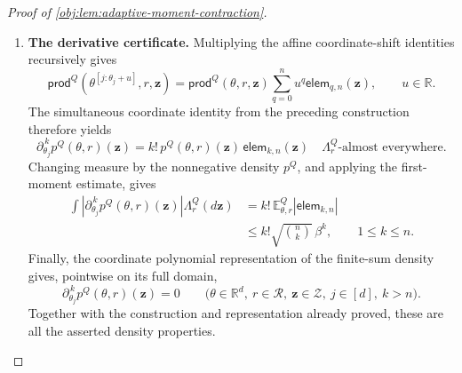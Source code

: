 \begin{proof}[Proof of \cref{obj:lem:adaptive-moment-contraction}]
\begin{enumerate}
The nonnegative centered square gives
\[
\begin{split}
0
&\le
\mathbb E^Q_{\theta,r}
 \left[
 \left(
 |\mathsf{elem}_{k,v}|
 -\mathbb E^Q_{\theta,r}|\mathsf{elem}_{k,v}|
 \right)^2
 \right]\\
&=
\mathbb E^Q_{\theta,r}[\mathsf{elem}_{k,v}^2]
-\left(\mathbb E^Q_{\theta,r}|\mathsf{elem}_{k,v}|\right)^2.
\end{split}
\]
Since \(\beta\ge0\), it follows that
\[
\mathbb E^Q_{\theta,r}|\mathsf{elem}_{k,v}|
\le\sqrt{\binom vk}\,\beta^k.
\]

\item \textbf{The derivative certificate.}
Multiplying the affine coordinate-shift identities recursively gives
\[
\mathsf{prod}^Q(\theta^{[j:\theta_j+u]},r,\mathbf z)
=
\mathsf{prod}^Q(\theta,r,\mathbf z)
\sum_{q=0}^n u^q\mathsf{elem}_{q,n}(\mathbf z),
\qquad u\in\mathbb R.
\]
The simultaneous coordinate identity from the preceding construction therefore yields
\[
\partial_{\theta_j}^{\,k}p^Q(\theta,r)(\mathbf z)
=
k!\,p^Q(\theta,r)(\mathbf z)\,
\mathsf{elem}_{k,n}(\mathbf z)
\quad
\Lambda_r^Q\text{-almost everywhere}.
\]
Changing measure by the nonnegative density \(p^Q\), and applying the first-moment estimate, gives
\[
\begin{split}
\int
\left|\partial_{\theta_j}^{\,k}p^Q(\theta,r)(\mathbf z)\right|
 \Lambda_r^Q(d\mathbf z)
&=
k!\,\mathbb E^Q_{\theta,r}|\mathsf{elem}_{k,n}|\\
&\le k!\sqrt{\binom nk}\,\beta^k,
\qquad 1\le k\le n.
\end{split}
\]
Finally, the coordinate polynomial representation of the finite-sum density gives, pointwise on its full domain,
\[
\partial_{\theta_j}^{\,k}p^Q(\theta,r)(\mathbf z)=0
\qquad
\bigl(\theta\in\mathbb R^d,\ r\in\mathcal R,\
\mathbf z\in\mathcal Z,\ j\in[d],\ k>n\bigr).
\]
Together with the construction and representation already proved, these are all the asserted density properties.


\end{enumerate}
\end{proof}
